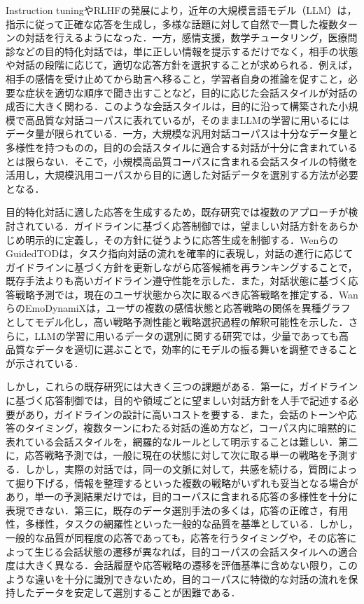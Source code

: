 \documentclass[manuscript,review,anonymous]{acmart}
\begin{document}
Instruction tuningやRLHFの発展により，近年の大規模言語モデル（LLM）は，指示に従って正確な応答を生成し，多様な話題に対して自然で一貫した複数ターンの対話を行えるようになった\cite{ouyang2022instructgpt}．一方，感情支援，数学チュータリング，医療問診などの目的特化対話では，単に正しい情報を提示するだけでなく，相手の状態や対話の段階に応じて，適切な応答方針を選択することが求められる\cite{rashkin2019empathetic,liu2021esconv}．例えば，相手の感情を受け止めてから助言へ移ること，学習者自身の推論を促すこと，必要な症状を適切な順序で聞き出すことなど，目的に応じた会話スタイルが対話の成否に大きく関わる．このような会話スタイルは，目的に沿って構築された小規模で高品質な対話コーパスに表れているが，そのままLLMの学習に用いるにはデータ量が限られている．一方，大規模な汎用対話コーパスは十分なデータ量と多様性を持つものの，目的の会話スタイルに適合する対話が十分に含まれているとは限らない．そこで，小規模高品質コーパスに含まれる会話スタイルの特徴を活用し，大規模汎用コーパスから目的に適した対話データを選別する方法が必要となる．

目的特化対話に適した応答を生成するため，既存研究では複数のアプローチが検討されている．ガイドラインに基づく応答制御では，望ましい対話方針をあらかじめ明示的に定義し，その方針に従うように応答生成を制御する．WenらのGuidedTODは，タスク指向対話の流れを確率的に表現し，対話の進行に応じてガイドラインに基づく方針を更新しながら応答候補を再ランキングすることで，既存手法よりも高いガイドライン遵守性能を示した\cite{wen2025guidedtod}．また，対話状態に基づく応答戦略予測では，現在のユーザ状態から次に取るべき応答戦略を推定する．WanらのEmoDynamiXは，ユーザの複数の感情状態と応答戦略の関係を異種グラフとしてモデル化し，高い戦略予測性能と戦略選択過程の解釈可能性を示した\cite{wan2025emodynamix}．さらに，LLMの学習に用いるデータの選別に関する研究では，少量であっても高品質なデータを適切に選ぶことで，効率的にモデルの振る舞いを調整できることが示されている\cite{zhou2023lima,zhang2025datasurvey}．

しかし，これらの既存研究には大きく三つの課題がある．第一に，ガイドラインに基づく応答制御では，目的や領域ごとに望ましい対話方針を人手で記述する必要があり，ガイドラインの設計に高いコストを要する．また，会話のトーンや応答のタイミング，複数ターンにわたる対話の進め方など，コーパス内に暗黙的に表れている会話スタイルを，網羅的なルールとして明示することは難しい．第二に，応答戦略予測では，一般に現在の状態に対して次に取る単一の戦略を予測する．しかし，実際の対話では，同一の文脈に対して，共感を続ける，質問によって掘り下げる，情報を整理するといった複数の戦略がいずれも妥当となる場合があり，単一の予測結果だけでは，目的コーパスに含まれる応答の多様性を十分に表現できない．第三に，既存のデータ選別手法の多くは，応答の正確さ，有用性，多様性，タスクの網羅性といった一般的な品質を基準としている．しかし，一般的な品質が同程度の応答であっても，応答を行うタイミングや，その応答によって生じる会話状態の遷移が異なれば，目的コーパスの会話スタイルへの適合度は大きく異なる．会話履歴や応答戦略の遷移を評価基準に含めない限り，このような違いを十分に識別できないため，目的コーパスに特徴的な対話の流れを保持したデータを安定して選別することが困難である．
\end{document}

